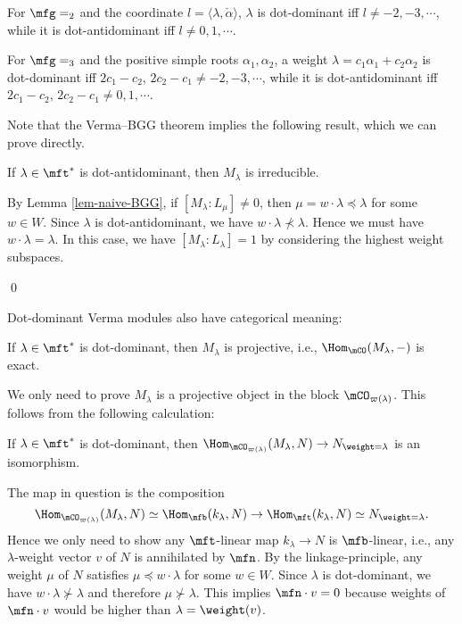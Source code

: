 	\begin{exam}
		For $\mfg=\sl_2$ and the coordinate $l=\langle \lambda,\check\alpha\rangle$, $\lambda$ is dot-dominant iff $l\neq -2,-3,\cdots$, while it is dot-antidominant iff $l\neq 0,1,\cdots$.
	\end{exam}

	\begin{exam}
		For $\mfg=\sl_3$ and the positive simple roots $\alpha_1,\alpha_2$, a weight $\lambda= c_1\alpha_1+c_2\alpha_2$ is dot-dominant iff $2c_1-c_2$, $2c_2-c_1 \neq -2,-3,\cdots$, while it is dot-antidominant iff $2c_1-c_2$, $2c_2-c_1 \neq 0,1,\cdots$.
		
	\end{exam}


	Note that the Verma--BGG theorem implies the following result, which we can prove directly.

	\begin{prop}
		If $\lambda\in \mft^*$ is dot-antidominant, then $M_\lambda$ is irreducible.
	\end{prop}

	\proof
		By Lemma \ref{lem-naive-BGG}, if $[M_\lambda:L_\mu]\neq 0$, then $\mu = w\cdot \lambda\preceq \lambda$ for some $w\in W$. Since $\lambda$ is dot-antidominant, we have $ w\cdot \lambda \nprec \lambda$. Hence we must have $w\cdot \lambda=\lambda$. In this case, we have $[M_\lambda:L_\lambda]=1$ by considering the highest weight subspaces.

	\qed

	Dot-dominant Verma modules also have categorical meaning:

	\begin{prop}
		\label{prop-dom-Verma-projective}
		If $\lambda\in \mft^*$ is dot-dominant, then $M_\lambda$ is projective, i.e., $\Hom_\mCO(M_\lambda,-)$ is exact.
	\end{prop}

	\proof
		We only need to prove $M_\lambda$ is a projective object in the block $\mCO_{\varpi(\lambda)}$. This follows from the following calculation:

		\begin{lem}
			If $\lambda\in \mft^*$ is dot-dominant, then $\Hom_{\mCO_{\varpi(\lambda)}}(M_\lambda,N) \to N_{\weight=\lambda}$ is an isomorphism. 
		\end{lem}

		\proof
			The map in question is the composition 
			\[
				\Hom_{\mCO_{\varpi(\lambda)}}(M_\lambda,N) \simeq \Hom_\mfb( k_\lambda,N ) \to \Hom_\mft( k_\lambda,N ) \simeq  N_{\weight=\lambda}.
			\]
			Hence we only need to show any $\mft$-linear map $k_\lambda \to N$ is $\mfb$-linear, i.e., any $\lambda$-weight vector $v$ of $N$ is annihilated by $\mfn$. By the linkage-principle, any weight $\mu$ of $N$ satisfies $\mu \preceq w\cdot \lambda$ for some $w\in W$. Since $\lambda$ is dot-dominant, we have $w\cdot \lambda\nsucc \lambda$ and therefore $\mu \nsucc \lambda$. This implies $\mfn\cdot v = 0$ because weights of $\mfn\cdot v$ would be higher than $\lambda = \weight(v)$.


